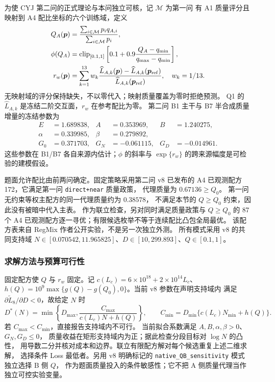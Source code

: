 为使 CYJ 第二问的正式理论与本问独立可核，记 $\mathcal M$ 为第一问
有 A1 质量评分且映射到 A4 配比坐标的六个训练域，定义
\begin{equation}
\begin{aligned}
Q_A(\boldsymbol p)&=
\frac{\sum_{i\in\mathcal M}p_iq_{A,i}}{\sum_{i\in\mathcal M}p_i},\\
\phi(Q_A)&=\operatorname{clip}_{[0.1,1]}
\left[0.1+0.9\frac{Q_A-q_{\min}}{q_{\max}-q_{\min}}\right],\\
r_w(\boldsymbol p)&=\sum_{k=1}^{13}w_k
\frac{\widehat L_{A,k}(\boldsymbol p)-
\widehat L_{A,k}(\boldsymbol p_{\rm ref})}
{\widehat L_{A,k}(\boldsymbol p_{\rm ref})},\quad w_k=1/13.
\end{aligned}
\label{eq:q3_v8_bridges}
\end{equation}
无映射域的评分保持缺失，不以零代入；映射质量覆盖为零时拒绝预测。
Q1 的 $\widehat L_{A,k}$ 是冻结二阶交互面，$r_w$ 在参考配比为零。
第二问 B1 主干与 B7 半合成质量增量的冻结参数为
\begin{equation*}
\begin{aligned}
E&=1.689838,& A&=0.353969,& B&=1.240275,\\
\alpha&=0.339985,&\beta&=0.279892,\\
G_0&=0.371703,&G_N&=-0.061115,&G_D&=-0.014961.
\end{aligned}
\end{equation*}
这些参数在 B1/B7 各自来源内估计；$\phi$ 的斜率与
$\exp\{r_w\}$ 的跨来源幅度是可检验的建模假设。

题面允许配比由前两问确定。固定策略采用第二问 v8 已发布的
A4 已观测配方 172，它满足第一问 \texttt{direct+near} 质量政策，
代理质量为 $0.67136\ge Q_0$。
第一问无约束等权主配方的同一代理质量约为 $0.38578$，
不满足本节的 $Q\ge Q_0$ 约束，因此没有被暗中代入主表。
作为联立检查，另对同时满足质量政策与 $Q\ge Q_0$ 的 87 个 A4
已观测配方逐一寻优；有限候选枚举不等于连续配比凸包全局最优。
该配方表来自 RegMix 作者公开实验\cite{regmix2025}，不是另一次独立外测。
所有模式采用 v8 的共同支持域
$N\in[0.070542,11.965825]$、$D\in[10,299.893]$、$Q\in[0.1,1]$。

\subsubsection{求解方法与预算可行性}
固定配方使 $Q$ 与 $r_w$ 固定。记
$c(L_c)=6\times10^{18}+2\times10^{14}L_c$、
$h(Q)=10^9\max\{g(Q)-g(Q_0),0\}$。当前 v8 参数在声明支持域内
满足 $\partial\widetilde L_8/\partial D<0$，故给定 $N$ 时
\begin{equation}
D^*(N)=\min\left\{D_{\max},\frac{C_{\max}}{c(L_c)N+h(Q)}\right\},
\qquad
C_{\min}=D_{\min}\{c(L_c)N_{\min}+h(Q)\}.
\label{eq:q3_v8_reduction}
\end{equation}
若 $C_{\max}<C_{\min}$，直接报告支持域内不可行。
当前拟合系数满足 $A,B,\alpha,\beta>0$、$G_N,G_D\le0$，
质量收益在矩形支持域内为正；据此检查分段目标对 $\log N$ 的凸性，
用导数二分并核对成本和边界。联立有限配方解对每个候选重复上述二维求解，
选择条件 Loss 最低者。另用 v8 明确标记的
\texttt{native\_QB\_sensitivity} 模式独立选择 B 侧 $Q$，
作为题面质量投入的条件敏感性；它不把 A 侧质量代理当作独立可控实验变量。

